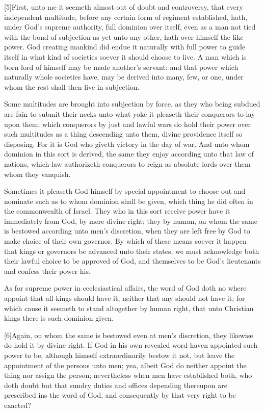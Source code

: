 [5]First, unto me it seemeth almost out of doubt and controversy, that every independent multitude, before any certain form of regiment established, hath, under God’s supreme authority, full dominion over itself, even as a man  not tied with the bond of subjection as yet unto any other, hath over himself the like power. God creating mankind did endue it naturally with full power to guide itself in what kind of societies soever it should choose to live. A man which is born lord of himself may be made another’s servant: and that power which naturally whole societies have, may be derived into many, few, or one, under whom the rest shall then live in subjection.

Some multitudes are brought into subjection by force, as they who being subdued are fain to submit their necks unto what yoke it pleaseth their conquerors to lay upon them; which conquerors by just and lawful wars do hold their power over such multitudes as a thing descending unto them, divine providence itself so disposing. For it is God who giveth victory in the day of war. And unto whom dominion in this sort is derived, the same they enjoy according unto that law of nations, which law authorizeth conquerors to reign as absolute lords over them whom they vanquish.

Sometimes it pleaseth God himself by special appointment to choose out and nominate such as to whom dominion shall be given, which thing he did often in the commonwealth of Israel. They who in this sort receive power have it immediately from God, by mere divine right; they by human, on whom the same is bestowed according unto men’s discretion, when they are left free by God to make choice of their own governor. By which of these means soever it happen that kings or governors be advanced unto their states, we must acknowledge both their lawful choice to be approved of God, and themselves to be God’s lieutenants and confess their power his.


As for supreme power in ecclesiastical affairs, the word of God doth no where appoint that all kings should have it, neither that any should not have it; for which cause it seemeth to stand altogether by human right, that unto Christian kings there is such dominion given.

[6]Again, on whom the same is bestowed even at men’s discretion, they likewise do hold it by divine right. If God in his own revealed word haven appointed such power to be, although himself extraordinarily bestow it not, but leave the appointment of the persons unto men; yea, albeit God do neither appoint the thing nor assign the person; nevertheless when men have established both, who doth doubt but that sundry duties and offices depending thereupon are prescribed ins the word of God, and consequently by that very right to be exacted?

